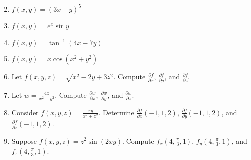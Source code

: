\documentclass[12pt]{article}
\newif\ifans
\begin{document}
\newpage


\begin{enumerate}
\setcounter{enumi}{1}

\item $f(x,y)=(3x-y)^5$

\ifans{\fbox{$f_x(x,y)=15(3x-y)^4$; $f_y(x,y)=-5(3x-y)^4$}} \fi

\item $f(x,y)=e^x\sin{y}$

\ifans{\fbox{$f_x(x,y)=e^x\sin{y}$; $f_y(x,y)=e^x\cos{y}$}} \fi

\item $f(x,y)=\tan^{-1}{(4x-7y)}$

\ifans{\fbox{$f_x(x,y)=\frac{4}{1+(4x-7y)^2}$; $f_y(x,y)=-\frac{7}{1+(4x-7y)^2}$}} \fi

\item $f(x,y)=x\cos{(x^2+y^2)}$

\ifans{\fbox{$f_x(x,y)=\cos{(x^2+y^2)}-2x^2\sin{(x^2+y^2)}$; $f_y(x,y)=-2xy\sin{(x^2+y^2)}$}} \fi

\item Let $f(x,y,z)=\sqrt{x^2-2y+3z^2}$.  Compute $\frac{\partial f}{\partial x}$,  $\frac{\partial f}{\partial y}$, and $\frac{\partial f}{\partial z}$.

\ifans{\fbox{$\frac{\partial f}{\partial x}=\frac{x}{\sqrt{x^2-2y+3z^2}}$; $\frac{\partial f}{\partial y}=\frac{-1}{\sqrt{x^2-2y+3z^2}}$; $\frac{\partial f}{\partial z}=\frac{3z}{\sqrt{x^2-2y+3z^2}}$}} \fi

\item Let $w=\frac{4z}{x^2+y^2}$.  Compute $\frac{\partial w}{\partial x}$, $\frac{\partial w}{\partial y}$, and $\frac{\partial w}{\partial z}$.

\ifans{\fbox{$\frac{\partial w}{\partial x}=-\frac{8xz}{(x^2+y^2)^2}$; $\frac{\partial w}{\partial y}=-\frac{8yz}{(x^2+y^2)^2}$; $\frac{\partial w}{\partial z}=\frac{4}{x^2+y^2}$}} \fi

\item Consider $f(x,y,z)=\frac{xy}{x^2+z^2}$.  Determine $\frac{\partial f}{\partial x}(-1, 1, 2)$, $\frac{\partial f}{\partial y}(-1, 1, 2)$, and $\frac{\partial f}{\partial z}(-1, 1, 2)$.

\ifans{\fbox{$\left.\frac{\partial f}{\partial x}\right|_{(x,y,z)=(-1,1,2)}=\frac{3}{25}$; $\left.\frac{\partial f}{\partial y}\right|_{(x,y,z)=(-1,1,2)}=-\frac{1}{5}$; $\left.\frac{\partial f}{\partial z}\right|_{(x,y,z)=(-1,1,2)}=\frac{4}{25}$}} \fi

\item Suppose $f(x,y,z)=z^2\sin{(2xy)}$.  Compute $f_x\left(4, \frac{\pi}{3}, 1\right)$, $f_y\left(4, \frac{\pi}{3}, 1\right)$, and $f_z\left(4, \frac{\pi}{3}, 1\right)$.

\ifans{\fbox{$f_x\left(4,\frac{\pi}{3},1\right)=-\frac{\pi}{3}$, $f_y\left(4,\frac{\pi}{3},2\right)=-4$, $f_z\left(4,\frac{\pi}{3},2\right)=\sqrt{3}$} } \fi

\end{enumerate}
\end{document}
